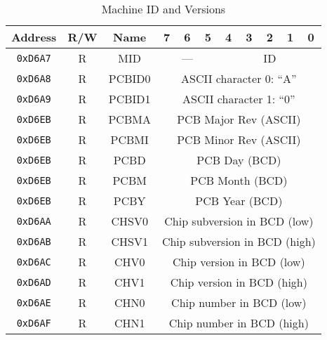 \begin{table}[ht]
    \begin{center}
        \begin{tabular}{|c|c|c|c|c|c|c|c|c|c|c|} \hline
            Address & R/W & Name & 7 & 6 & 5 & 4 & 3 & 2 & 1 & 0 \\\hline\hline
            \verb+0xD6A7+ & R & MID & \multicolumn{3}{|c|}{---} & \multicolumn{5}{|c|}{ID} \\ \hline\hline

            \verb+0xD6A8+ & R & PCBID0 & \multicolumn{8}{|c|}{ASCII character 0: ``A''} \\ \hline
            \verb+0xD6A9+ & R & PCBID1 & \multicolumn{8}{|c|}{ASCII character 1: ``0''} \\ \hline
            \verb+0xD6EB+ & R & PCBMA & \multicolumn{8}{|c|}{PCB Major Rev (ASCII)} \\ \hline
            \verb+0xD6EB+ & R & PCBMI & \multicolumn{8}{|c|}{PCB Minor Rev (ASCII)} \\ \hline
            \verb+0xD6EB+ & R & PCBD & \multicolumn{8}{|c|}{PCB Day (BCD)} \\ \hline
            \verb+0xD6EB+ & R & PCBM & \multicolumn{8}{|c|}{PCB Month (BCD)} \\ \hline
            \verb+0xD6EB+ & R & PCBY & \multicolumn{8}{|c|}{PCB Year (BCD)} \\ \hline\hline

            \verb+0xD6AA+ & R & CHSV0 & \multicolumn{8}{|c|}{Chip subversion in BCD (low)} \\ \hline
            \verb+0xD6AB+ & R & CHSV1 & \multicolumn{8}{|c|}{Chip subversion in BCD (high)} \\ \hline
            \verb+0xD6AC+ & R & CHV0 & \multicolumn{8}{|c|}{Chip version in BCD (low)} \\ \hline
            \verb+0xD6AD+ & R & CHV1 & \multicolumn{8}{|c|}{Chip version in BCD (high)} \\ \hline
            \verb+0xD6AE+ & R & CHN0 & \multicolumn{8}{|c|}{Chip number in BCD (low)} \\ \hline
            \verb+0xD6AF+ & R & CHN1 & \multicolumn{8}{|c|}{Chip number in BCD (high)} \\ \hline
        \end{tabular}
    \end{center}
    \caption{Machine ID and Versions}
    \label{tab:machine_id_ver}
\end{table}

